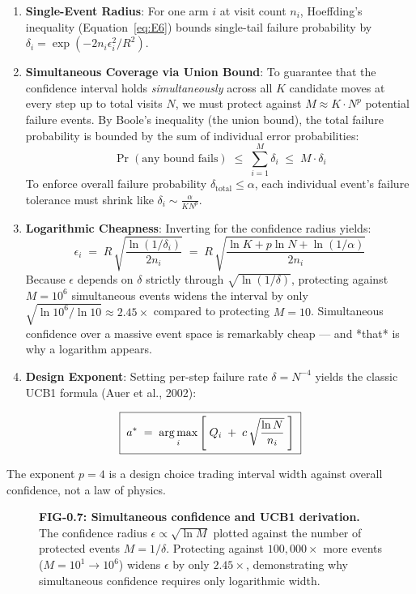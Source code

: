 \begin{enumerate}[label=(\alph*)]
\item \textbf{Single-Event Radius}: For one arm $i$ at visit count $n_i$, Hoeffding's inequality (Equation~\eqref{eq:E6}) bounds single-tail failure probability by $\delta_i = \exp(-2n_i\epsilon_i^2/R^2)$.
\item \textbf{Simultaneous Coverage via Union Bound}: To guarantee that the confidence interval holds \textit{simultaneously} across all $K$ candidate moves at every step up to total visits $N$, we must protect against $M \approx K \cdot N^p$ potential failure events. By Boole's inequality (the union bound), the total failure probability is bounded by the sum of individual error probabilities:
$$\Pr(\text{any bound fails}) \;\le\; \sum_{i=1}^{M} \delta_i \;\le\; M \cdot \delta_i$$
To enforce overall failure probability $\delta_{\text{total}} \le \alpha$, each individual event's failure tolerance must shrink like $\delta_i \sim \frac{\alpha}{K N^p}$.
\item \textbf{Logarithmic Cheapness}: Inverting for the confidence radius yields:
$$\epsilon_i \;=\; R\,\sqrt{\frac{\ln(1/\delta_i)}{2n_i}} \;=\; R\,\sqrt{\frac{\ln K + p\ln N + \ln(1/\alpha)}{2n_i}}$$
Because $\epsilon$ depends on $\delta$ strictly through $\sqrt{\ln(1/\delta)}$, protecting against $M = 10^6$ simultaneous events widens the interval by only $\sqrt{\ln 10^6 / \ln 10} \approx 2.45\times$ compared to protecting $M = 10$. Simultaneous confidence over a massive event space is remarkably cheap — and *that* is why a logarithm appears.
\item \textbf{Design Exponent}: Setting per-step failure rate $\delta = N^{-4}$ yields the classic UCB1 formula (Auer et al., 2002):
\end{enumerate}

\begin{equation}
\label{eq:E7}
\boxed{\;a^* \;=\; \operatorname*{arg\,max}_{i} \left[\; Q_i \;+\; c\,\sqrt{\frac{\ln N}{n_i}} \;\right]\;}
\end{equation}

The exponent $p = 4$ is a design choice trading interval width against overall confidence, not a law of physics.

\begin{figure}[htbp]
\centering

\caption{\textbf{FIG-0.7: Simultaneous confidence and UCB1 derivation.} The confidence radius $\epsilon \propto \sqrt{\ln M}$ plotted against the number of protected events $M = 1/\delta$. Protecting against $100,000\times$ more events ($M=10^1 \to 10^6$) widens $\epsilon$ by only $2.45\times$, demonstrating why simultaneous confidence requires only logarithmic width.}
\label{fig:0_7}
\end{figure}


